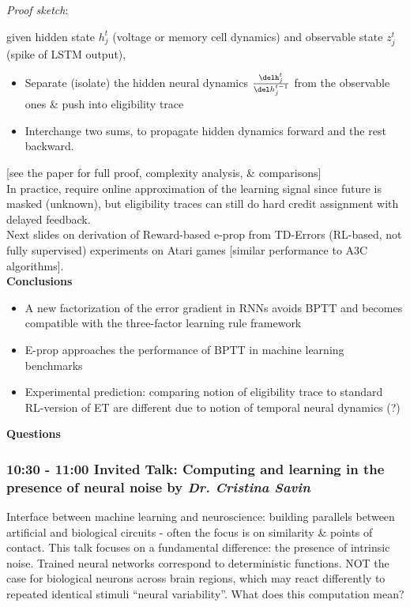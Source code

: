 \documentclass[12pt]{article}
\begin{document}
\textit{Proof sketch}:

given hidden state $h_j^t$ (voltage or memory cell dynamics) and observable state $z_j^t$ (spike of LSTM output), 
\begin{itemize}
    \item Separate (isolate) the hidden neural dynamics $\frac{\delh_j^t}{\del h_j^{t-1}}$ from the observable ones & push into eligibility trace
    \item Interchange two sums, to propagate hidden dynamics forward and the rest backward.
\end{itemize}

[see the paper for full proof, complexity analysis, & comparisons] \\

In practice, require online approximation of the learning signal since future is masked (unknown), but eligibility traces can still do hard credit assignment with delayed feedback. \\

Next slides on derivation of Reward-based e-prop from TD-Errors (RL-based, not fully supervised) experiments on Atari games [similar performance to A3C algorithms]. \\

\textbf{Conclusions} 
\begin{itemize}
    \item A new factorization of the error gradient in RNNs avoids BPTT and becomes compatible with the three-factor learning rule framework
    \item E-prop approaches the performance of BPTT in machine learning benchmarks
    \item Experimental prediction: comparing notion of eligibility trace to standard RL-version of ET are different due to notion of temporal neural dynamics (?)
\end{itemize}

\textbf{Questions} \\ 


\subsubsection{10:30 - 11:00 Invited Talk: Computing and learning in the presence of neural noise by \textit{Dr. Cristina Savin}}

Interface between machine learning and neuroscience: building parallels between artificial and biological circuits - often the focus is on similarity \& points of contact. This talk focuses on a fundamental difference: the presence of intrinsic noise. Trained neural networks correspond to deterministic functions. NOT the case for biological neurons across brain regions, which may react differently to repeated identical stimuli ``neural variability''. What does this computation mean? \\
\end{document}

